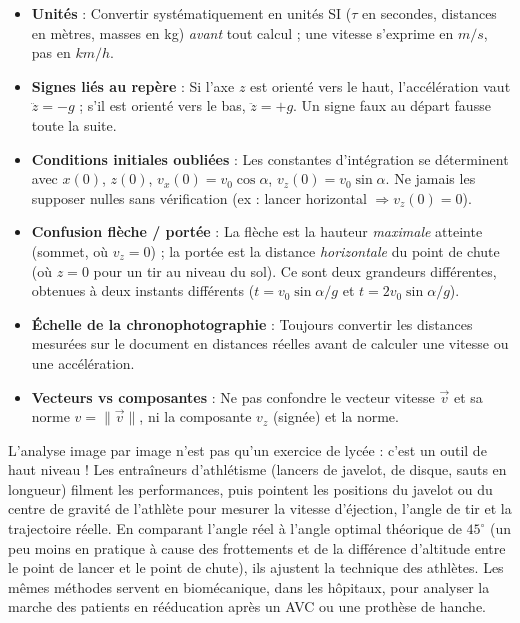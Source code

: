 \documentclass[11pt]{article}
\newcommand{\cle}[1]{{\popxbold\color{popdark}#1}}
\begin{document}
\begin{attention}
\begin{itemize}
\item \textbf{Unités} : Convertir systématiquement en unités SI ($\tau$ en secondes, distances en mètres, masses en kg) \emph{avant} tout calcul ; une vitesse s'exprime en $\si{m/s}$, pas en $\si{km/h}$.
\item \textbf{Signes liés au repère} : Si l'axe $z$ est orienté vers le haut, l'accélération vaut $\ddot{z} = -g$ ; s'il est orienté vers le bas, $\ddot{z} = +g$. Un signe faux au départ fausse toute la suite.
\item \textbf{Conditions initiales oubliées} : Les constantes d'intégration se déterminent avec $x(0)$, $z(0)$, $v_x(0) = v_0\cos\alpha$, $v_z(0) = v_0\sin\alpha$. Ne jamais les supposer nulles sans vérification (ex : lancer horizontal $\Rightarrow v_z(0)=0$).
\item \textbf{Confusion flèche / portée} : La \cle{flèche} est la hauteur \emph{maximale} atteinte (sommet, où $v_z = 0$) ; la \cle{portée} est la distance \emph{horizontale} du point de chute (où $z = 0$ pour un tir au niveau du sol). Ce sont deux grandeurs différentes, obtenues à deux instants différents ($t = v_0\sin\alpha/g$ et $t = 2v_0\sin\alpha/g$).
\item \textbf{Échelle de la chronophotographie} : Toujours convertir les distances mesurées sur le document en distances réelles avant de calculer une vitesse ou une accélération.
\item \textbf{Vecteurs vs composantes} : Ne pas confondre le vecteur vitesse $\vec{v}$ et sa norme $v = \|\vec{v}\|$, ni la composante $v_z$ (signée) et la norme.
\end{itemize}
\end{attention}

\begin{savaistu}
L'analyse image par image n'est pas qu'un exercice de lycée : c'est un outil de haut niveau ! Les entraîneurs d'athlétisme (lancers de javelot, de disque, sauts en longueur) filment les performances, puis pointent les positions du javelot ou du centre de gravité de l'athlète pour mesurer la vitesse d'éjection, l'angle de tir et la trajectoire réelle. En comparant l'angle réel à l'angle optimal théorique de $45^\circ$ (un peu moins en pratique à cause des frottements et de la différence d'altitude entre le point de lancer et le point de chute), ils ajustent la technique des athlètes. Les mêmes méthodes servent en biomécanique, dans les hôpitaux, pour analyser la marche des patients en rééducation après un AVC ou une prothèse de hanche.
\end{savaistu}
\end{document}
